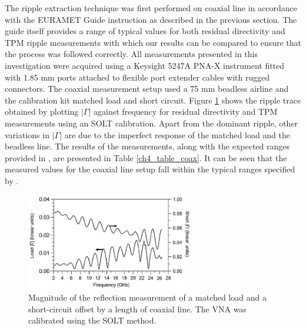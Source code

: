 \documentclass[../thesis/thesis.tex]{subfiles}
\begin{document}
\begin{refsection}
The ripple extraction technique was first performed on coaxial line in accordance with the EURAMET Guide \cite{EURAMET_2011} instruction as described in the previous section. The guide itself provides a range of typical values for both residual directivity and TPM ripple measurements with which our results can be compared to ensure that the process was followed correctly. All measurements presented in this investigation were acquired using a Keysight 5247A PNA-X instrument fitted with 1.85 mm ports attached to flexible port extender cables with rugged connectors. The coaxial measurement setup used a 75 mm beadless airline and the calibration kit matched load and short circuit. Figure \ref{ch4_fig_coax} shows the ripple trace obtained by plotting $|\Gamma|$ against frequency for residual directivity and TPM measurements using an SOLT calibration. Apart from the dominant ripple, other variations in $|\Gamma|$ are due to the imperfect response of the matched load and the beadless line. The results of the measurements, along with the expected ranges provided in \cite{EURAMET_2011}, are presented in Table \ref{ch4_table_coax}. It can be seen that the measured values for the coaxial line setup fall within the typical ranges specified by \cite{EURAMET_2011}.

\begin{figure}
	\centering
	\includegraphics[width=0.65\textwidth]{coax.png}
	\caption{Magnitude of the reflection measurement of a matched load and a short-circuit offset by a length of coaxial line. The VNA was calibrated using the SOLT method.}
	\label{ch4_fig_coax}
\end{figure}


\end{refsection}
\end{document}
